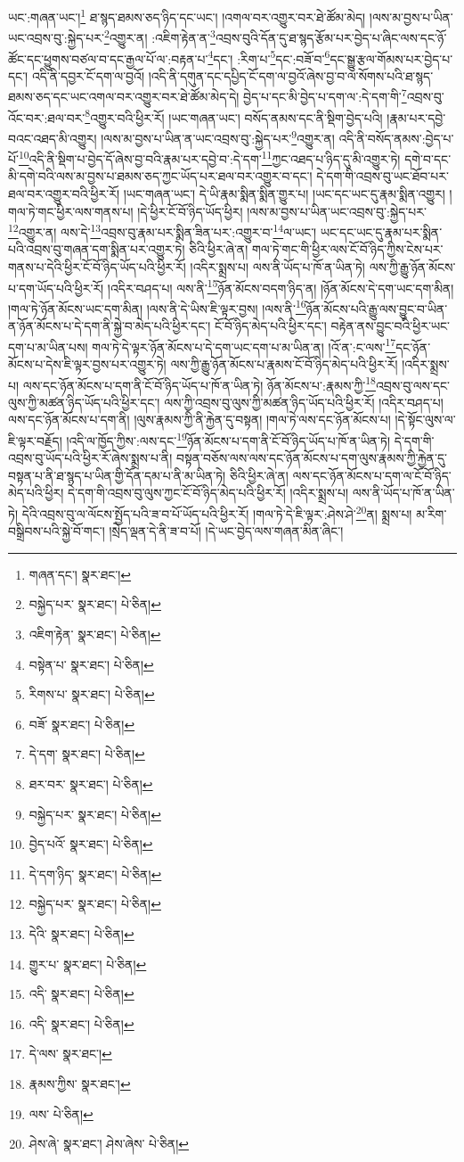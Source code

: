 ཡང་:གཞན་ཡང་།\footnote{གཞན་དང་།  སྣར་ཐང་། } ཐ་སྙད་ཐམས་ཅད་ཉིད་དང་ཡང་། །འགལ་བར་འགྱུར་བར་ཐེ་ཚོམ་མེད། །ལས་མ་བྱས་པ་ཡིན་ཡང་འབྲས་བུ་:སྐྱེད་པར་\footnote{བསྐྱེད་པར་  སྣར་ཐང་།  པེ་ཅིན། }འགྱུར་ན། :འཇིག་རྟེན་ན་\footnote{འཇིག་རྟེན་  སྣར་ཐང་།  པེ་ཅིན། }འབྲས་བུའི་དོན་དུ་ཐ་སྙད་རྩོམ་པར་བྱེད་པ་ཞིང་ལས་དང་ཉོ་ཚོང་དང་ཕྱུགས་བཙལ་བ་དང་རྒྱལ་པོ་ལ་:བརྟན་པ་\footnote{བསྟེན་པ་  སྣར་ཐང་།  པེ་ཅིན། }དང་། :རིག་པ་\footnote{རིགས་པ་  སྣར་ཐང་།  པེ་ཅིན། }དང་:བཟོ་བ་\footnote{བཟོ་  སྣར་ཐང་།  པེ་ཅིན། }དང་སྒྱུ་རྩལ་གོམས་པར་བྱེད་པ་དང་། འདི་ནི་དབྱར་ངོ་དག་ལ་བྱའོ། །འདི་ནི་དགུན་དང་དཔྱིད་ངོ་དག་ལ་བྱའོ་ཞེས་བྱ་བ་ལ་སོགས་པའི་ཐ་སྙད་ཐམས་ཅད་དང་ཡང་འགལ་བར་འགྱུར་བར་ཐེ་ཚོམ་མེད་དེ། བྱེད་པ་དང་མི་བྱེད་པ་དག་ལ་:དེ་དག་གི་\footnote{དེ་དག་  སྣར་ཐང་།  པེ་ཅིན། }འབྲས་བུ་འོང་བར་:ཐལ་བར་\footnote{ཐར་བར་  སྣར་ཐང་།  པེ་ཅིན། }འགྱུར་བའི་ཕྱིར་རོ། །ཡང་གཞན་ཡང་། བསོད་ནམས་དང་ནི་སྡིག་བྱེད་པའི། །རྣམ་པར་དབྱེ་བའང་འཐད་མི་འགྱུར། །ལས་མ་བྱས་པ་ཡིན་ན་ཡང་འབྲས་བུ་:སྐྱེད་པར་\footnote{བསྐྱེད་པར་  སྣར་ཐང་།  པེ་ཅིན། }འགྱུར་ན། འདི་ནི་བསོད་ནམས་:བྱེད་པ་པོ་\footnote{བྱེད་པའོ་  སྣར་ཐང་།  པེ་ཅིན། }འདི་ནི་སྡིག་པ་བྱེད་དོ་ཞེས་བྱ་བའི་རྣམ་པར་དབྱེ་བ་:དེ་དག་\footnote{དེ་དག་ཉིད་  སྣར་ཐང་།  པེ་ཅིན། }ཀྱང་འཐད་པ་ཉིད་དུ་མི་འགྱུར་ཏེ། དགེ་བ་དང་མི་དགེ་བའི་ལས་མ་བྱས་པ་ཐམས་ཅད་ཀྱང་ཡོད་པར་ཐལ་བར་འགྱུར་བ་དང་། དེ་དག་གི་འབྲས་བུ་ཡང་ཐོབ་པར་ཐལ་བར་འགྱུར་བའི་ཕྱིར་རོ། །ཡང་གཞན་ཡང་། དེ་ཡི་རྣམ་སྨིན་སྨིན་གྱུར་པ། །ཡང་དང་ཡང་དུ་རྣམ་སྨིན་འགྱུར། །གལ་ཏེ་གང་ཕྱིར་ལས་གནས་པ། །དེ་ཕྱིར་ངོ་བོ་ཉིད་ཡོད་ཕྱིར། །ལས་མ་བྱས་པ་ཡིན་ཡང་འབྲས་བུ་:སྐྱེད་པར་\footnote{བསྐྱེད་པར་  སྣར་ཐང་།  པེ་ཅིན། }འགྱུར་ན། ལས་དེ་\footnote{དེའི་  སྣར་ཐང་།  པེ་ཅིན། }འབྲས་བུ་རྣམ་པར་སྨིན་ཟིན་པར་:འགྱུར་བ་\footnote{གྱུར་པ་  སྣར་ཐང་།  པེ་ཅིན། }ལ་ཡང་། ཡང་དང་ཡང་དུ་རྣམ་པར་སྨིན་པའི་འབྲས་བུ་གཞན་དག་སྨིན་པར་འགྱུར་ཏེ། ཅིའི་ཕྱིར་ཞེ་ན། གལ་ཏེ་གང་གི་ཕྱིར་ལས་ངོ་བོ་ཉིད་ཀྱིས་ངེས་པར་གནས་པ་དེའི་ཕྱིར་ངོ་བོ་ཉིད་ཡོད་པའི་ཕྱིར་རོ། །འདིར་སྨྲས་པ། ལས་ནི་ཡོད་པ་ཁོ་ན་ཡིན་ཏེ། ལས་ཀྱི་རྒྱུ་ཉོན་མོངས་པ་དག་ཡོད་པའི་ཕྱིར་རོ། །འདིར་བཤད་པ། ལས་ནི་\footnote{འདི་  སྣར་ཐང་།  པེ་ཅིན། }ཉོན་མོངས་བདག་ཉིད་ན། །ཉོན་མོངས་དེ་དག་ཡང་དག་མིན། །གལ་ཏེ་ཉོན་མོངས་ཡང་དག་མིན། །ལས་ནི་དེ་ཡིས་ཇི་ལྟར་བྱས། །ལས་ནི་\footnote{འདི་  སྣར་ཐང་།  པེ་ཅིན། }ཉོན་མོངས་པའི་རྒྱུ་ལས་བྱུང་བ་ཡིན་ན་ཉོན་མོངས་པ་དེ་དག་ནི་སྐྱེ་བ་མེད་པའི་ཕྱིར་དང་། ངོ་བོ་ཉིད་མེད་པའི་ཕྱིར་དང་། བརྟེན་ནས་བྱུང་བའི་ཕྱིར་ཡང་དག་པ་མ་ཡིན་པས། གལ་ཏེ་དེ་ལྟར་ཉོན་མོངས་པ་དེ་དག་ཡང་དག་པ་མ་ཡིན་ན། །འོ་ན་:ང་ལས་\footnote{དེ་ལས་  སྣར་ཐང་། }དང་ཉོན་མོངས་པ་དེས་ཇི་ལྟར་བྱས་པར་འགྱུར་ཏེ། ལས་ཀྱི་རྒྱུ་ཉོན་མོངས་པ་རྣམས་ངོ་བོ་ཉིད་མེད་པའི་ཕྱིར་རོ། །འདིར་སྨྲས་པ། ལས་དང་ཉོན་མོངས་པ་དག་ནི་ངོ་བོ་ཉིད་ཡོད་པ་ཁོ་ན་ཡིན་ཏེ། ཉོན་མོངས་པ་:རྣམས་ཀྱི་\footnote{རྣམས་ཀྱིས་  སྣར་ཐང་། }འབྲས་བུ་ལས་དང་ལུས་ཀྱི་མཚན་ཉིད་ཡོད་པའི་ཕྱིར་དང་། ལས་ཀྱི་འབྲས་བུ་ལུས་ཀྱི་མཚན་ཉིད་ཡོད་པའི་ཕྱིར་རོ། །འདིར་བཤད་པ། ལས་དང་ཉོན་མོངས་པ་དག་ནི། །ལུས་རྣམས་ཀྱི་ནི་རྐྱེན་དུ་བསྟན། །གལ་ཏེ་ལས་དང་ཉོན་མོངས་པ། །དེ་སྟོང་ལུས་ལ་ཇི་ལྟར་བརྗོད། །འདི་ལ་ཁྱོད་ཀྱིས་:ལས་དང་\footnote{ལས་  པེ་ཅིན། }ཉོན་མོངས་པ་དག་ནི་ངོ་བོ་ཉིད་ཡོད་པ་ཁོ་ན་ཡིན་ཏེ། དེ་དག་གི་འབྲས་བུ་ཡོད་པའི་ཕྱིར་རོ་ཞེས་སྨྲས་པ་ནི། བསྟན་བཅོས་ལས་ལས་དང་ཉོན་མོངས་པ་དག་ལུས་རྣམས་ཀྱི་རྐྱེན་དུ་བསྟན་པ་ནི་ཐ་སྙད་པ་ཡིན་གྱི་དོན་དམ་པ་ནི་མ་ཡིན་ཏེ། ཅིའི་ཕྱིར་ཞེ་ན། ལས་དང་ཉོན་མོངས་པ་དག་ལ་ངོ་བོ་ཉིད་མེད་པའི་ཕྱིར། དེ་དག་གི་འབྲས་བུ་ལུས་ཀྱང་ངོ་བོ་ཉིད་མེད་པའི་ཕྱིར་རོ། །འདིར་སྨྲས་པ། ལས་ནི་ཡོད་པ་ཁོ་ན་ཡིན་ཏེ། དེའི་འབྲས་བུ་ལ་ལོངས་སྤྱོད་པའི་ཟ་བ་པོ་ཡོད་པའི་ཕྱིར་རོ། །གལ་ཏེ་དེ་ཇི་ལྟར་:ཤེས་ཤེ་\footnote{ཤེས་ཞེ་  སྣར་ཐང་། ཤེས་ཞེས་  པེ་ཅིན། }ན། སྨྲས་པ། མ་རིག་བསྒྲིབས་པའི་སྐྱེ་བོ་གང་། །སྲེད་ལྡན་དེ་ནི་ཟ་བ་པོ། །དེ་ཡང་བྱེད་ལས་གཞན་མིན་ཞིང་། 